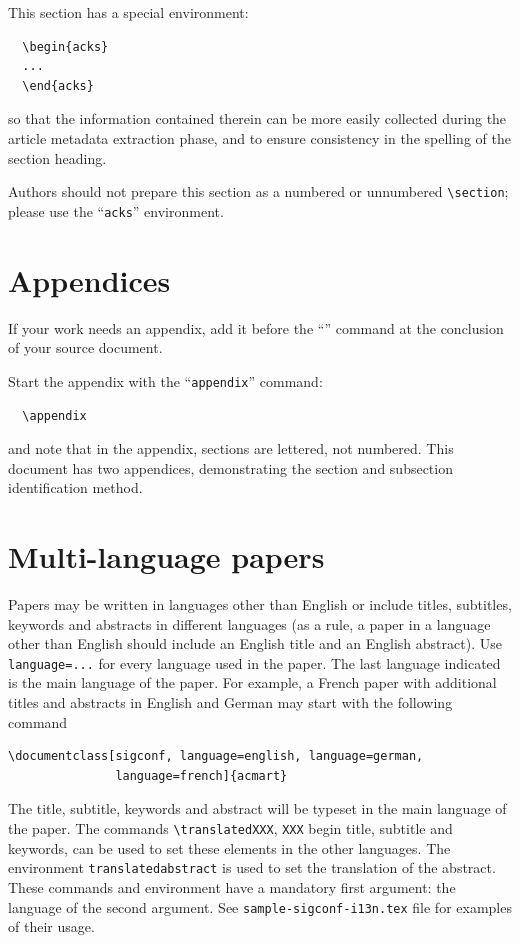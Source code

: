 This section has a special environment:
\begin{verbatim}
  \begin{acks}
  ...
  \end{acks}
\end{verbatim}
so that the information contained therein can be more easily collected
during the article metadata extraction phase, and to ensure
consistency in the spelling of the section heading.

Authors should not prepare this section as a numbered or unnumbered {\verb|\section|}; please use the ``{\verb|acks|}'' environment.

\section{Appendices}

If your work needs an appendix, add it before the
``\verb||'' command at the conclusion of your source
document.

Start the appendix with the ``\verb|appendix|'' command:
\begin{verbatim}
  \appendix
\end{verbatim}
and note that in the appendix, sections are lettered, not
numbered. This document has two appendices, demonstrating the section
and subsection identification method.

\section{Multi-language papers}

Papers may be written in languages other than English or include
titles, subtitles, keywords and abstracts in different languages (as a
rule, a paper in a language other than English should include an
English title and an English abstract).  Use \verb|language=...| for
every language used in the paper.  The last language indicated is the
main language of the paper.  For example, a French paper with
additional titles and abstracts in English and German may start with
the following command
\begin{verbatim}
\documentclass[sigconf, language=english, language=german,
               language=french]{acmart}
\end{verbatim}

The title, subtitle, keywords and abstract will be typeset in the main
language of the paper.  The commands \verb|\translatedXXX|, \verb|XXX|
begin title, subtitle and keywords, can be used to set these elements
in the other languages.  The environment \verb|translatedabstract| is
used to set the translation of the abstract.  These commands and
environment have a mandatory first argument: the language of the
second argument.  See \verb|sample-sigconf-i13n.tex| file for examples
of their usage.

